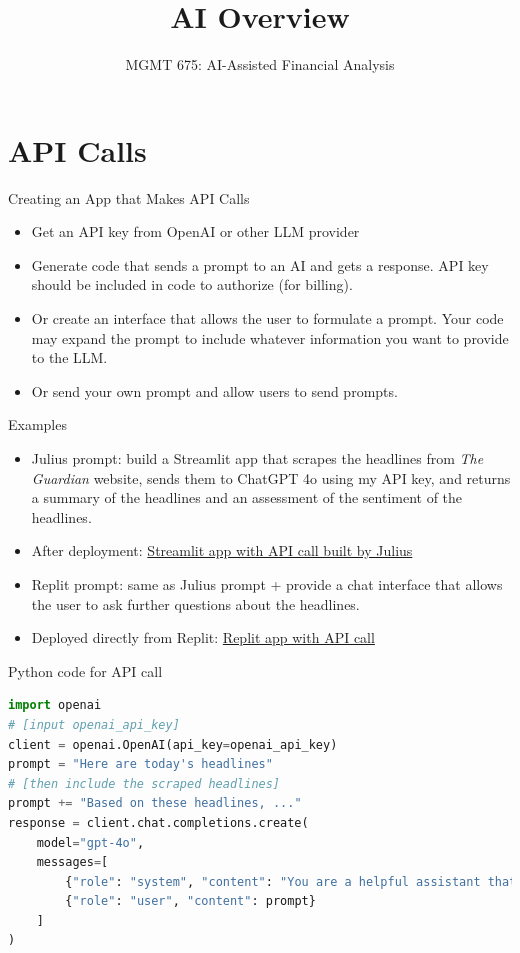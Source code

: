 \documentclass[10pt]{beamer}
\title{AI Overview}
\subtitle{MGMT 675: AI-Assisted Financial Analysis}
\date{}
\begin{document}
\begin{frame}[plain]
\titlepage
\end{frame}

\section{API Calls}
\begin{frame}{Creating an App that Makes API Calls}
\begin{itemize}
    \item Get an API key from OpenAI or other LLM provider
\item Generate code that sends a prompt to an AI and gets a response.  API key should be included in code to authorize (for billing).
\item Or create an interface that allows the user to formulate a prompt.  Your code may expand the prompt to include whatever information you want to provide to the LLM.
\item Or send your own prompt and allow users to send prompts.
\end{itemize}
\end{frame}

\begin{frame}{Examples}
    \begin{itemize}
        \item Julius prompt: build a Streamlit app that scrapes the headlines from \textit{The Guardian} website, sends them to ChatGPT 4o using my API key, and returns a summary of the headlines and an assessment of the sentiment of the headlines.
        \item After deployment: \href{https://mgmt675-app-kbhft94zmjfhfjqbdq9csf.streamlit.app/}{Streamlit app with API call built by Julius}
        \item Replit prompt: same as Julius prompt + provide a chat interface that allows the user to ask further questions about the headlines.
        \item Deployed directly from Replit: \href{https://guardian-pulse-kerryback.replit.app/}{Replit app with API call}
    \end{itemize}
    \end{frame}

\begin{frame}[fragile]{Python code for API call}
    \begin{lstlisting}[language=Python]
import openai
# [input openai_api_key]
client = openai.OpenAI(api_key=openai_api_key)
prompt = "Here are today's headlines"
# [then include the scraped headlines]
prompt += "Based on these headlines, ..."
response = client.chat.completions.create(
    model="gpt-4o",
    messages=[
        {"role": "system", "content": "You are a helpful assistant that analyzes news headlines."},
        {"role": "user", "content": prompt}
    ]
)
    \end{lstlisting}
\end{frame}
\end{document}
